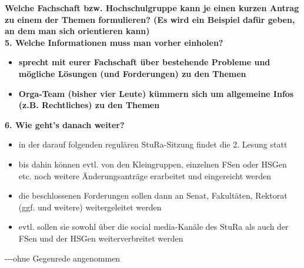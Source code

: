 \textbf{\MVRightArrow Welche Fachschaft bzw. Hochschulgruppe kann je einen kurzen Antrag zu einem der Themen formulieren? (Es wird ein Beispiel dafür geben, an dem man sich orientieren kann)}\\[1.5em]
\textbf{5. Welche Informationen muss man vorher einholen?}
\begin{itemize}
    \item[\MVRightArrow] \textbf{sprecht mit eurer Fachschaft über bestehende Probleme und mögliche Lösungen (und Forderungen) zu den Themen}
    \item[\MVRightArrow] \textbf{Orga-Team (bisher vier Leute) kümmern sich um allgemeine Infos (z.B. Rechtliches) zu den Themen}
\end{itemize}
\textbf{6. Wie geht’s danach weiter?}
\begin{itemize}
    \item in der darauf folgenden regulären StuRa-Sitzung findet die 2. Lesung statt
    \item bis dahin können evtl. von den Kleingruppen, einzelnen FSen oder HSGen etc. noch weitere Änderungsanträge erarbeitet und eingereicht werden
    \item die beschlossenen Forderungen sollen dann an Senat, Fakultäten, Rektorat (ggf. und weitere) weitergeleitet werden
    \item evtl. sollen sie sowohl über die social media-Kanäle des StuRa als auch der FSen und der HSGen weiterverbreitet werden
\end{itemize}

{\ul{}
}{-}{-}{-}{ohne Gegenrede angenommen}